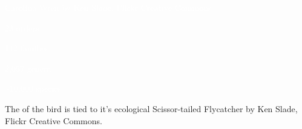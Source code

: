 \documentclass[t]{beamer}
\begin{document}

{
\begin{frame}[b,plain]
	\tiny\hspace{4em}\textcolor{white}{Carolina Wren by Ken Slade, Flickr Creative Commons.}
\end{frame}
}


{
\begin{frame}[t,plain]
	\vspace{7em}
	
	\pause
	\hangpara\Large\hspace{14em}\textcolor{white}{23 orders}

	\hangpara\Large\hspace{14em}\textcolor{white}{142 families}
	
	\hangpara\Large\hspace{14em}\textcolor{white}{2,057 genera}
	
	\hangpara\Large\hspace{14em}\textcolor{white}{\textasciitilde10,000 species}

	

\end{frame}
}


{
\begin{frame}[b,plain]{The  of the bird is tied to it’s ecological }
	\hfill\tiny Scissor-tailed Flycatcher by Ken Slade, Flickr Creative Commons.
\end{frame}
}
\end{document}
